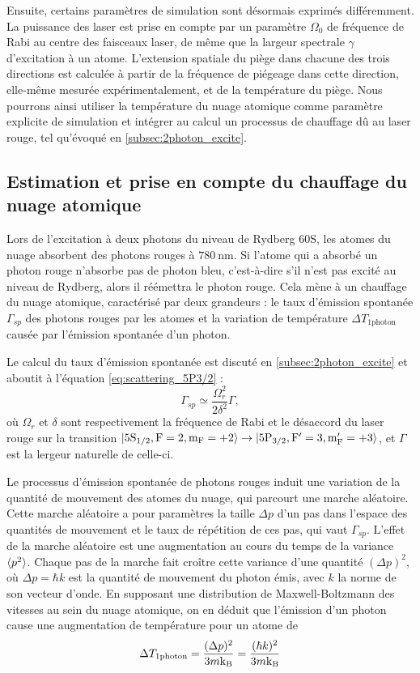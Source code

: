 Ensuite, certains paramètres de simulation sont désormais exprimés différemment.
La puissance des laser est prise en compte par un paramètre $\Omega_0$ de fréquence de Rabi au centre des faisceaux laser, de même que la largeur spectrale $\gamma$ d'excitation à un atome.
L'extension spatiale du piège dans chacune des trois directions est calculée à partir de la fréquence de piégeage dans cette direction, elle-même mesurée expérimentalement, et de la température du piège.
Nous pourrons ainsi utiliser la température du nuage atomique comme paramètre explicite de simulation et intégrer au calcul un processus de chauffage dû au laser rouge, tel qu'évoqué en \ref{subsec:2photon_excite}.

\subsection{Estimation et prise en compte du chauffage du nuage atomique}
\noindent Lors de l'excitation à deux photons du niveau de Rydberg $\mathrm{60S}$, les atomes du nuage absorbent des photons rouges à $\SI{780}{\nano\meter}$.
Si l'atome qui a absorbé un photon rouge n'absorbe pas de photon bleu, c'est-à-dire s'il n'est pas excité au niveau de Rydberg, alors il réémettra le photon rouge.
Cela mène à un chauffage du nuage atomique, caractérisé par deux grandeurs :
le taux d'émission spontanée $\Gamma_{sp}$ des photons rouges par les atomes et la variation de température $\Delta T_{\text{1photon}}$ causée par l'émission spontanée d'un photon.

Le calcul du taux d'émission spontanée est discuté en \ref{subsec:2photon_excite} et aboutit à l'équation \eqref{eq:scattering_5P3/2} :
\begin{equation}
\label{eq:Gamma_sp}
\Gamma_{sp} \simeq \frac{\Omega_r^2}{2\delta^2}\Gamma,
\end{equation}
où $\Omega_r$ et $\delta$ sont respectivement la fréquence de Rabi et le désaccord du laser rouge sur la transition $\ket{\mathrm{5S_{1/2},F=2,m_F=+2}} \rightarrow \ket{\mathrm{5P_{3/2},F'=3,m_F'=+3}}$, et $\Gamma$ est la lergeur naturelle de celle-ci.

Le processus d'émission spontanée de photons rouges induit une variation de la quantité de mouvement des atomes du nuage, qui parcourt une marche aléatoire.
Cette marche aléatoire a pour paramètres la taille $\Delta p$ d'un pas dans l'espace des quantités de mouvement et le taux de répétition de ces pas, qui vaut $\Gamma_{sp}$.
L'effet de la marche aléatoire est une augmentation au cours du temps de la variance $\braket{p^2}$.
Chaque pas de la marche fait croître cette variance d'une quantité $(\Delta p)^2$, où $\Delta p = \hbar k$ est la quantité de mouvement du photon émis, avec $k$ la norme de son vecteur d'onde.
En supposant une distribution de Maxwell-Boltzmann des vitesses au sein du nuage atomique, on en déduit que l'émission d'un photon cause une augmentation de température pour un atome de
\begin{equation}
\label{eq:heating_1photon}
\Delta T_{\text{1photon}} = \frac{(\Delta p)^2}{3m\mathrm{k_B}} = \frac{(\hbar k)^2}{3m\mathrm{k_B}}
\end{equation}

